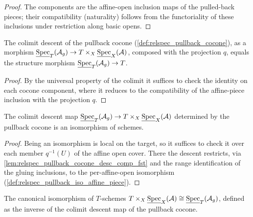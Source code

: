 \begin{proof}
  The components are the affine-open inclusion maps of the pulled-back pieces; their
  compatibility (naturality) follows from the functoriality of these inclusions under
  restriction along basic opens.
\end{proof}

\begin{lemma}
  \label{lem:relspec_pullback_cocone_desc_comp_fst}
  The colimit descent of the pullback cocone
  (\cref{def:relspec_pullback_cocone}), as a morphism
  \(\underline{\operatorname{Spec}}_T(\mathcal{A}_g) \to
    T \times_X \underline{\operatorname{Spec}}_X(\mathcal{A})\),
  composed with the projection \(q\), equals the structure morphism
  \(\underline{\operatorname{Spec}}_T(\mathcal{A}_g) \to T\).
\end{lemma}

\begin{proof}
  By the universal property of the colimit it suffices to check the identity on each
  cocone component, where it reduces to the compatibility of the affine-piece
  inclusion with the projection \(q\).
\end{proof}

\begin{lemma}
  \label{lem:relspec_pullback_iso_desc_isiso}
  The colimit descent map
  \(\underline{\operatorname{Spec}}_T(\mathcal{A}_g) \to
    T \times_X \underline{\operatorname{Spec}}_X(\mathcal{A})\)
  determined by the pullback cocone is an isomorphism of schemes.
\end{lemma}

\begin{proof}
  Being an isomorphism is local on the target, so it suffices to check it over each
  member \(q^{-1}(U)\) of the affine open cover. There the descent restricts, via
  \cref{lem:relspec_pullback_cocone_desc_comp_fst} and the range identification of the
  gluing inclusions, to the per-affine-open isomorphism
  (\cref{def:relspec_pullback_iso_affine_piece}).
\end{proof}

\begin{definition}
  \label{def:relspec_pullback_iso_construction}
  The canonical isomorphism of \(T\)-schemes
  \(T \times_X \underline{\operatorname{Spec}}_X(\mathcal{A}) \cong
    \underline{\operatorname{Spec}}_T(\mathcal{A}_g)\),
  defined as the inverse of the colimit descent map of the pullback cocone.
\end{definition}

